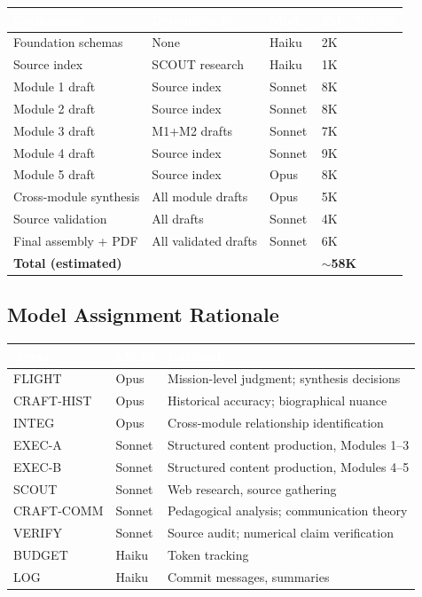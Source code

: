 \documentclass[11pt,letterpaper]{article}
\newcommand{\tableheader}[1]{\textbf{\sffamily\textcolor{white}{#1}}}
\begin{document}
\begin{center}
\begin{tabularx}{\textwidth}{L{3cm}L{2.5cm}C{1.8cm}C{1.5cm}}
\toprule
{}
\tableheader{Component} & \tableheader{Dependencies} & \tableheader{Model} & \tableheader{Est.~Tokens} \\
\midrule
Foundation schemas & None & Haiku & 2K \\
Source index & SCOUT research & Haiku & 1K \\
Module 1 draft & Source index & Sonnet & 8K \\
Module 2 draft & Source index & Sonnet & 8K \\
Module 3 draft & M1+M2 drafts & Sonnet & 7K \\
Module 4 draft & Source index & Sonnet & 9K \\
Module 5 draft & Source index & Opus & 8K \\
Cross-module synthesis & All module drafts & Opus & 5K \\
Source validation & All drafts & Sonnet & 4K \\
Final assembly + PDF & All validated drafts & Sonnet & 6K \\
\textbf{Total (estimated)} & & & \textbf{$\sim$58K} \\
\bottomrule
\end{tabularx}
\end{center}

\subsection{Model Assignment Rationale}

\begin{center}
\begin{tabularx}{\textwidth}{L{2.5cm}C{1.5cm}X}
\toprule
{}
\tableheader{Agent} & \tableheader{Model} & \tableheader{Rationale} \\
\midrule
FLIGHT & Opus & Mission-level judgment; synthesis decisions \\
CRAFT-HIST & Opus & Historical accuracy; biographical nuance \\
INTEG & Opus & Cross-module relationship identification \\
EXEC-A & Sonnet & Structured content production, Modules 1--3 \\
EXEC-B & Sonnet & Structured content production, Modules 4--5 \\
SCOUT & Sonnet & Web research, source gathering \\
CRAFT-COMM & Sonnet & Pedagogical analysis; communication theory \\
VERIFY & Sonnet & Source audit; numerical claim verification \\
BUDGET & Haiku & Token tracking \\
LOG & Haiku & Commit messages, summaries \\
\bottomrule
\end{tabularx}
\end{center}
\end{document}
